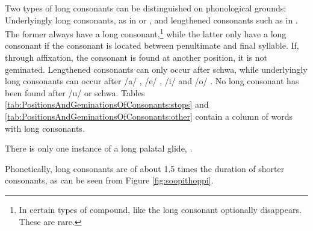 Two types of long consonants can be distinguished on phonological grounds: Underlyingly long consonants, as in  or , and lengthened consonants such as in . The former  always have a long consonant,\footnote{In certain types of compound, like 
the long consonant optionally disappears. These are rare.} while the latter only have a long consonant if the consonant is located between penultimate and final syllable. If, through affixation, the consonant is found at another position, it is not geminated. Lengthened consonants can only occur after schwa, while underlyingly long consonants can occur after /a/ , /e/ , /i/  and  /o/ . No long consonant has been found after /u/ or schwa.
Tables \ref{tab:PositionsAndGeminationsOfConsonants:stops} and \ref{tab:PositionsAndGeminationsOfConsonants:other}  contain a column of words with long consonants.

There is only one instance of a long palatal glide, .

Phonetically, long consonants are of about 1.5 times the duration of shorter consonants, as can be seen from Figure \ref{fig:soopithoppi}.

% 



